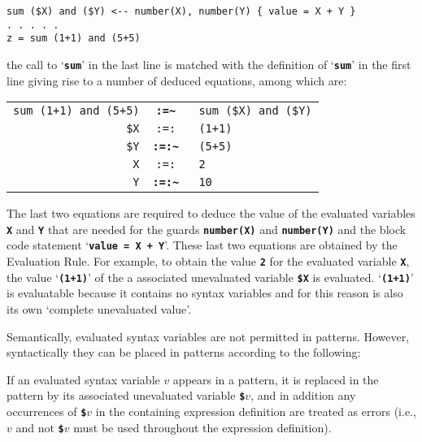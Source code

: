 \documentclass[12pt]{article}
\newcommand{\TT}[1]{{\tt \bfseries #1}}
\newcommand{\ikey}[2]{{\bf \em #1}\index{#2}}
\newenvironment{indpar}[1][0.3in]%
	{\begin{list}{}%
		     {\setlength{\itemsep}{0in}%
		      \setlength{\topsep}{0in}%
		      \setlength{\parsep}{1ex}%
		      \setlength{\labelwidth}{#1}%
		      \setlength{\leftmargin}{#1}%
		      \addtolength{\leftmargin}{\labelsep}}%
	 \item}%
	{\end{list}}
\begin{document}
\begin{indpar}\begin{verbatim}
sum ($X) and ($Y) <-- number(X), number(Y) { value = X + Y }
. . . . .
z = sum (1+1) and (5+5)
\end{verbatim}\end{indpar}

the call to `\TT{sum}' in the last line is matched with the definition
of `\TT{sum}' in the first line giving rise to a number of deduced
equations, among which are:

\begin{center}
\begin{tabular}{rcl}
\verb/sum (1+1) and (5+5)/ & \TT{:=\~~}
			      & \verb/sum ($X) and ($Y)/ \\
\verb/$X/ & \tt :=: & \verb/(1+1)/ \\
\verb/$Y/ & \TT{:=:\~~} & \verb/(5+5)/ \\
\verb/X/ & \tt :=: & \verb/2/ \\
\verb/Y/ & \TT{:=:\~~} & \verb/10/ \\
\end{tabular}
\end{center}

The last two equations are required to deduce the value of the evaluated
variables \TT{X} and \TT{Y} that are needed for the guards
\TT{number(X)} and \TT{number(Y)} and the block code statement
`\TT{value = X + Y}'.  These last two equations are obtained by
the Evaluation Rule.  For example, to obtain the value \TT{2} for the
evaluated variable \TT{X}, the value `\TT{(1+1)}' of the a associated
unevaluated variable \TT{\$X} is evaluated.  `\TT{(1+1)}' is
evaluatable because it contains no syntax variables and for this reason is
also its own `complete unevaluated value'.

Semantically, evaluated syntax variables are not permitted in patterns.
However, syntactically they can be placed in patterns according to the
following:

\begin{indpar}
\begin{list}{}{}
\item [\ikey{Evaluated Variable Pattern Rule}%
{evaluated variable!pattern rule}:]%
\label{EVALUATED-VARIABLE-PROMOTION-RULE}
If an evaluated syntax variable $v$ appears in a pattern, it is 
replaced in the pattern by its associated unevaluated variable
\TT{\$}$v$, and in addition
any occurrences of \TT{\$}$v$ in the containing expression definition
are treated as errors (i.e., $v$ and not \TT{\$}$v$ must be used
throughout the expression definition).
\end{list}
\end{indpar}
\end{document}
